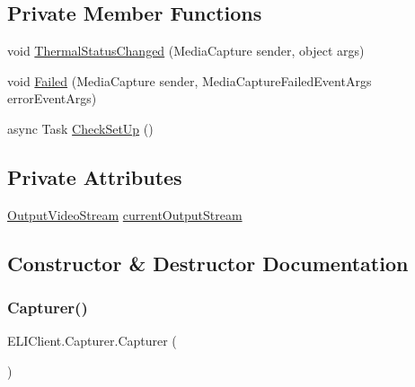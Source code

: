 \subsection*{Private Member Functions}
\begin{DoxyCompactItemize}
\item 
void \hyperlink{class_e_l_i_client_1_1_capturer_a8ec8dc9bc9feaab18678ec7243d3fe1a}{Thermal\+Status\+Changed} (Media\+Capture sender, object args)
\item 
void \hyperlink{class_e_l_i_client_1_1_capturer_af6d3770fe2218af444a50373c9113edd}{Failed} (Media\+Capture sender, Media\+Capture\+Failed\+Event\+Args error\+Event\+Args)
\item 
async Task \hyperlink{class_e_l_i_client_1_1_capturer_a2f70c5ede4af4832530c9a6e0bc550d3}{Check\+Set\+Up} ()
\end{DoxyCompactItemize}
\subsection*{Private Attributes}
\begin{DoxyCompactItemize}
\item 
\hyperlink{class_e_l_i_client_1_1_output_video_stream}{Output\+Video\+Stream} \hyperlink{class_e_l_i_client_1_1_capturer_a7c579fcee6eca00cf6f438d5983a1299}{current\+Output\+Stream}
\end{DoxyCompactItemize}


\subsection{Constructor \& Destructor Documentation}
\mbox{\label{class_e_l_i_client_1_1_capturer_a3455ba52cb52e5297f02e95413eec9c5}} 
\subsubsection{\texorpdfstring{Capturer()}{Capturer()}}
{\footnotesize\ttfamily E\+L\+I\+Client.\+Capturer.\+Capturer (\begin{DoxyParamCaption}{ }\end{DoxyParamCaption})\hspace{0.3cm}{\ttfamily [inline]}}



